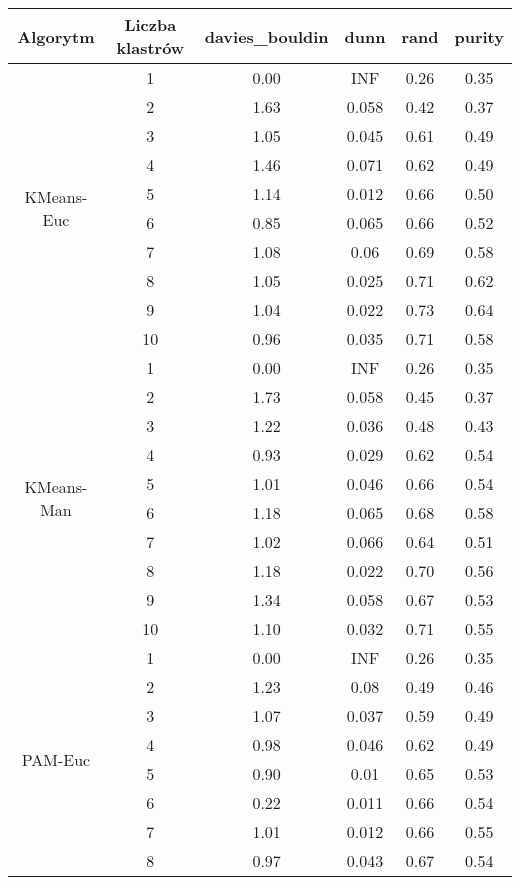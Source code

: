 \begin{table}[H]
\centering
\begin{tabular}{cc|cccc}
  \hline
Algorytm & Liczba klastrów & davies\_bouldin & dunn & rand & purity \\ 
  \hline
  \multirow{10}{*}{KMeans-Euc} & 1 & 0.00 & INF & 0.26 & 0.35 \\ 
   & 2 & 1.63 & 0.058 & 0.42 & 0.37 \\ 
   & 3 & 1.05 & 0.045 & 0.61 & 0.49 \\ 
   & 4 & 1.46 & 0.071 & 0.62 & 0.49 \\ 
   & 5 & 1.14 & 0.012 & 0.66 & 0.50 \\ 
   & 6 & 0.85 & 0.065 & 0.66 & 0.52 \\ 
   & 7 & 1.08 & 0.06 & 0.69 & 0.58 \\ 
   & 8 & 1.05 & 0.025 & 0.71 & 0.62 \\ 
   & 9 & 1.04 & 0.022 & 0.73 & 0.64 \\ 
   & 10 & 0.96 & 0.035 & 0.71 & 0.58 \\ \hline \hline 
  \multirow{10}{*}{KMeans-Man} & 1 & 0.00 & INF & 0.26 & 0.35 \\ 
  & 2 & 1.73 & 0.058 & 0.45 & 0.37 \\ 
  & 3 & 1.22 & 0.036 & 0.48 & 0.43 \\ 
  & 4 & 0.93 & 0.029 & 0.62 & 0.54 \\ 
  & 5 & 1.01 & 0.046 & 0.66 & 0.54 \\ 
  & 6 & 1.18 & 0.065 & 0.68 & 0.58 \\ 
  & 7 & 1.02 & 0.066 & 0.64 & 0.51 \\ 
  & 8 & 1.18 & 0.022 & 0.70 & 0.56 \\ 
  & 9 & 1.34 & 0.058 & 0.67 & 0.53 \\ 
  & 10 & 1.10 & 0.032 & 0.71 & 0.55 \\ \hline \hline
  \multirow{10}{*}{PAM-Euc} & 1 & 0.00 & INF & 0.26 & 0.35 \\ 
  & 2 & 1.23 & 0.08 & 0.49 & 0.46 \\ 
  & 3 & 1.07 & 0.037 & 0.59 & 0.49 \\ 
  & 4 & 0.98 & 0.046 & 0.62 & 0.49 \\ 
  & 5 & 0.90 & 0.01 & 0.65 & 0.53 \\ 
  & 6 & 0.22 & 0.011 & 0.66 & 0.54 \\ 
  & 7 & 1.01 & 0.012 & 0.66 & 0.55 \\ 
  & 8 & 0.97 & 0.043 & 0.67 & 0.54 \\ 

\end{tabular}
\end{table}
